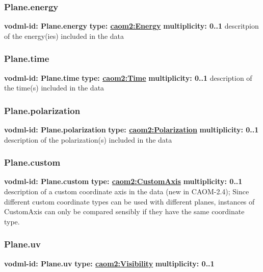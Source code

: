     \subsubsection{Plane.energy}
      \textbf{vodml-id: Plane.energy} \newline
      \textbf{type: \hyperref[sect:Energy]{caom2:Energy}} \newline
      \textbf{multiplicity: 0..1} \newline
      descritpion of the energy(ies) included in the data

    \subsubsection{Plane.time}
      \textbf{vodml-id: Plane.time} \newline
      \textbf{type: \hyperref[sect:Time]{caom2:Time}} \newline
      \textbf{multiplicity: 0..1} \newline
      description of the time(s) included in the data

    \subsubsection{Plane.polarization}
      \textbf{vodml-id: Plane.polarization} \newline
      \textbf{type: \hyperref[sect:Polarization]{caom2:Polarization}} \newline
      \textbf{multiplicity: 0..1} \newline
      description of the polarization(s) included in the data

    \subsubsection{Plane.custom}
      \textbf{vodml-id: Plane.custom} \newline
      \textbf{type: \hyperref[sect:CustomAxis]{caom2:CustomAxis}} \newline
      \textbf{multiplicity: 0..1} \newline
      description of a custom coordinate axis in the data (new in CAOM-2.4); Since different custom coordinate types can be used with different planes, instances of CustomAxis can only be compared sensibly if they have the same coordinate type.

    \subsubsection{Plane.uv}
      \textbf{vodml-id: Plane.uv} \newline
      \textbf{type: \hyperref[sect:Visibility]{caom2:Visibility}} \newline
      \textbf{multiplicity: 0..1} 

